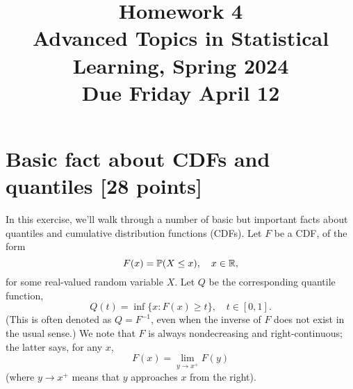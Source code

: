 \documentclass{article}
\title{Homework 4 \\ \smallskip
\large Advanced Topics in Statistical Learning, Spring 2024 \\ \smallskip
Due Friday April 12}
\date{}
\begin{document}
\maketitle
\RaggedRight
\vspace{-50pt}

\section{Basic fact about CDFs and quantiles [28 points]}

In this exercise, we'll walk through a number of basic but important facts about 
quantiles and cumulative distribution functions (CDFs). Let $F$ be a CDF, of the
form 
\[
F(x) = \mathbb{P}(X \leq x), \quad x \in \mathbb{R},
\]
for some real-valued random variable $X$. Let $Q$ be the corresponding quantile 
function,
\[
Q(t) = \inf \{ x : F(x) \geq t \}, \quad t \in [0,1].
\]
(This is often denoted as $Q = F^{-1}$, even when the inverse of $F$ does not
exist in the usual sense.) We note that $F$ is always nondecreasing and 
right-continuous; the latter says, for any $x$,    
\[
F(x) = \lim_{y \to x^+} F(y)
\]
(where $y \to x^+$ means that $y$ approaches $x$ from the right).
\end{document}
